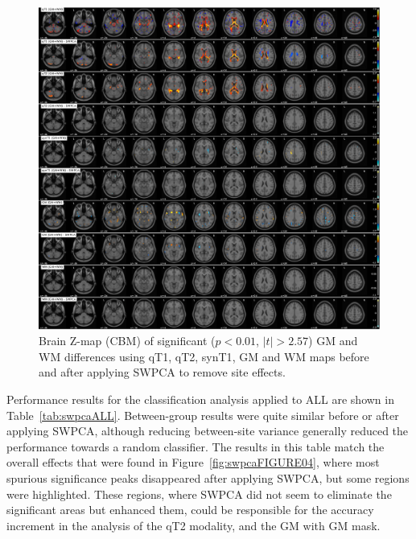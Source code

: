 \begin{figure}
	\centering
	\includegraphics[width=\linewidth]{Graphics/ch7/FIGURE05}
	\caption[Brain Z-map (\acs{CBM}) of significant ($p<0.01$, $|t|>2.57$) \acs{GM} and \acs{WM} differences using \acs{qT1}, \acs{qT2}, \acs{synT1}, \acs{GM} and \acs{WM} maps before and after applying \acs{SWPCA} to remove site effects.]{Brain Z-map (\ac{CBM}) of significant ($p<0.01$, $|t|>2.57$) \acs{GM} and \acs{WM} differences using \ac{qT1}, \ac{qT2}, \ac{synT1}, \ac{GM} and \ac{WM} maps before and after applying \ac{SWPCA} to remove site effects.}
	\label{fig:swpcaFIGURE05}
\end{figure}

Performance results for the classification analysis applied to ALL are shown in Table~\ref{tab:swpcaALL}. Between-group results were quite similar before or after applying \ac{SWPCA}, although reducing between-site variance generally reduced the performance towards a random classifier. The results in this table match the overall effects that were found in Figure~\ref{fig:swpcaFIGURE04}, where most spurious significance peaks disappeared after applying \ac{SWPCA}, but some regions were highlighted. These regions, where \ac{SWPCA} did not seem to eliminate the significant areas but enhanced them, could be responsible for the accuracy increment in the analysis of the \ac{qT2} modality, and the \ac{GM} with GM mask.

